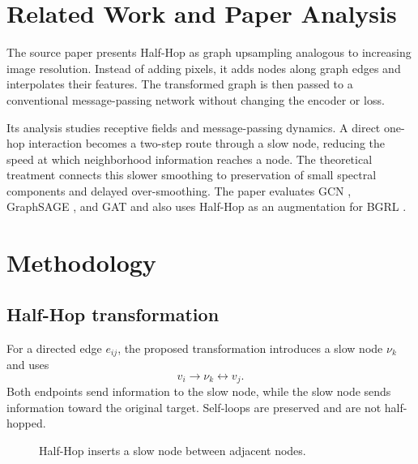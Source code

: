 \documentclass[conference]{IEEEtran}
\begin{document}
\section{Related Work and Paper Analysis}
The source paper \cite{azabou} presents Half-Hop as graph upsampling analogous to increasing image resolution. Instead of adding pixels, it adds nodes along graph edges and interpolates their features. The transformed graph is then passed to a conventional message-passing network without changing the encoder or loss.

Its analysis studies receptive fields and message-passing dynamics. A direct one-hop interaction becomes a two-step route through a slow node, reducing the speed at which neighborhood information reaches a node. The theoretical treatment connects this slower smoothing to preservation of small spectral components and delayed over-smoothing. The paper evaluates GCN \cite{kipf}, GraphSAGE \cite{hamilton}, and GAT \cite{gat} and also uses Half-Hop as an augmentation for BGRL \cite{thakoor}.

\section{Methodology}
\subsection{Half-Hop transformation}
For a directed edge $e_{ij}$, the proposed transformation introduces a slow node $\nu_k$ and uses
\begin{equation}
v_i \rightarrow \nu_k \leftrightarrow v_j.
\end{equation}
Both endpoints send information to the slow node, while the slow node sends information toward the original target. Self-loops are preserved and are not half-hopped.

\begin{figure}[H]
\centering
{}
\caption{Half-Hop inserts a slow node between adjacent nodes.}
\label{fig:schematic}
\end{figure}
\end{document}
